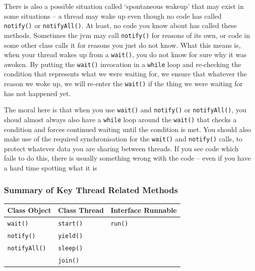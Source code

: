 There is also a possible situation called `spontaneous wakeup' that may exist 
in some situations -- a thread may wake up even though no code has called 
\verb#notify()# or \verb#notifyAll()#. At least, no code you know about has 
called these methods. Sometimes the jvm may call \verb#notify()# for reasons of 
its own, or code in some other class calls it for reasons you just do not know.
What this means is, when your thread wakes up from a \verb#wait()#, you do not 
know for sure why it was awoken. By putting the \verb#wait()# invocation in a 
\verb#while# loop and re-checking the condition that represents what we were 
waiting for, we ensure that whatever the reason we woke up, we will re-enter 
the \verb#wait()# if the thing we were waiting for has not happened yet. 

The moral here is that when you use \verb#wait()# and \verb#notify()# or 
\verb#notifyAll()#, you shoud almost always also have a \verb#while# loop 
around the \verb#wait()# that checks a condition and forces continued waiting 
until the condition is met. You should also make use of the required 
synchronisation for the \verb#wait()# and \verb#notify()# calls, to protect 
whatever data you are sharing between threads. If you see code which fails to 
do this, there is usually something wrong with the code -- even if you have a 
hard time spotting what it is

\subsubsection{Summary of Key Thread Related Methods}
\begin{center}
\begin{tabular}{lll}
    \textbf{Class Object} & \textbf{Class Thread} & \textbf{Interface Runnable} 
    \\
    \hline
    \verb#wait()# & \verb#start()# & \verb#run()# \\
    \verb#notify()# & \verb#yield()# & \\
    \verb#notifyAll()# & \verb#sleep()# & \\
    & \verb#join()# & \\
\end{tabular}
\end{center}
